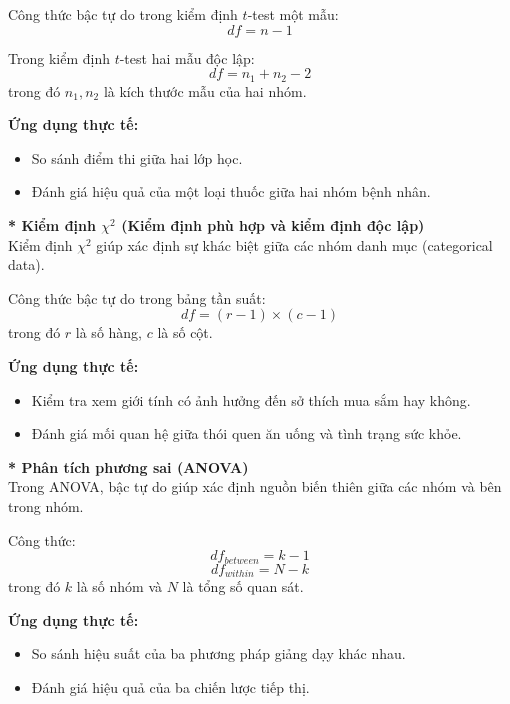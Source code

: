 Công thức bậc tự do trong kiểm định $t$-test một mẫu:
\begin{equation}
    df = n - 1
\end{equation}

Trong kiểm định $t$-test hai mẫu độc lập:
\begin{equation}
    df = n_1 + n_2 - 2
\end{equation}
trong đó $n_1, n_2$ là kích thước mẫu của hai nhóm.

\textbf{Ứng dụng thực tế:}
\begin{itemize}
    \item So sánh điểm thi giữa hai lớp học.
    \item Đánh giá hiệu quả của một loại thuốc giữa hai nhóm bệnh nhân.
\end{itemize}

\noindent\textbf{* Kiểm định $\chi^2$ (Kiểm định phù hợp và kiểm định độc lập)}\\
Kiểm định $\chi^2$ giúp xác định sự khác biệt giữa các nhóm danh mục (categorical data).

Công thức bậc tự do trong bảng tần suất:
\begin{equation}
    df = (r - 1) \times (c - 1)
\end{equation}
trong đó $r$ là số hàng, $c$ là số cột.

\textbf{Ứng dụng thực tế:}
\begin{itemize}
    \item Kiểm tra xem giới tính có ảnh hưởng đến sở thích mua sắm hay không.
    \item Đánh giá mối quan hệ giữa thói quen ăn uống và tình trạng sức khỏe.
\end{itemize}

\noindent\textbf{* Phân tích phương sai (ANOVA)}\\
Trong ANOVA, bậc tự do giúp xác định nguồn biến thiên giữa các nhóm và bên trong nhóm.

Công thức:
\begin{equation}
    df_{between} = k - 1
\end{equation}
\begin{equation}
    df_{within} = N - k
\end{equation}
trong đó $k$ là số nhóm và $N$ là tổng số quan sát.

\textbf{Ứng dụng thực tế:}
\begin{itemize}
    \item So sánh hiệu suất của ba phương pháp giảng dạy khác nhau.
    \item Đánh giá hiệu quả của ba chiến lược tiếp thị.
\end{itemize}



